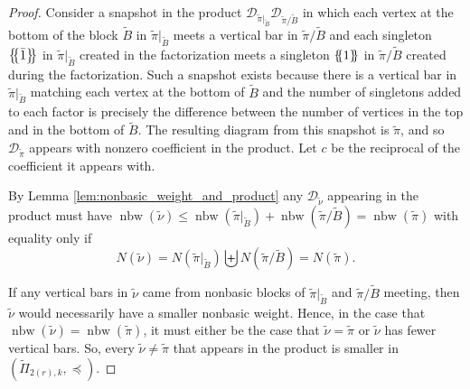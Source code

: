 \documentclass[10pt]{amsart}
\theoremstyle{definition}
\theoremstyle{definition}
\theoremstyle{plain}
\theoremstyle{remark}
\theoremstyle{plain}
\theoremstyle{plain}
\newcommand{\DD}{\mathcal{D}}
\newcommand{\tpi}{{\tilde{\pi}}}
\newcommand{\tnu}{{\tilde{\nu}}}
\newcommand{\tB}{{\tilde{B}}}
\newcommand{\multi}[1]{\left\{\mskip-5mu\left\{#1\right\}\mskip-5mu\right\}}
\newcommand{\ov}[1]{\bar{#1}}
\DeclareMathOperator{\nbw}{nbw}
\begin{document}
\begin{proof}

    Consider a snapshot in the product $\DD_{\tpi|_{\tB}}\DD_{\tpi/\tB}$ in which each vertex at the bottom of the block $\tB$ in $\tpi|_{\tB}$ meets a vertical bar in $\tpi/\tB$ and each singleton $\multi{\ov1}$ in $\tpi|_{\tB}$ created in the factorization meets a singleton $\multi{1}$ in $\tpi/\tB$ created during the factorization. Such a snapshot exists because there is a vertical bar in $\tpi|_{\tB}$ matching each vertex at the bottom of $\tB$ and the number of singletons added to each factor is precisely the difference between the number of vertices in the top and in the bottom of $\tB$. The resulting diagram from this snapshot is $\tpi$, and so $\DD_\tpi$ appears with nonzero coefficient in the product. Let $c$ be the reciprocal of the coefficient it appears with.

    By Lemma \ref{lem:nonbasic_weight_and_product} any $\DD_\tnu$ appearing in the product must have $\nbw(\tnu)\leq\nbw(\tpi|_{\tB})+\nbw(\tpi/\tB)=\nbw(\tpi)$ with equality only if \[N(\tnu)=N(\tpi|_{\tB})\biguplus N(\tpi/\tB)=N(\tpi).\]

    If any vertical bars in $\tnu$ came from nonbasic blocks of $\tpi|_{\tB}$ and $\tpi/\tB$ meeting, then $\tnu$ would necessarily have a smaller nonbasic weight. Hence, in the case that $\nbw(\tnu)=\nbw(\tpi)$, it must either be the case that $\tnu=\tpi$ or $\tnu$ has fewer vertical bars. So, every $\tnu\neq\tpi$ that appears in the product is smaller in $(\tilde\Pi_{2(r),k},\preceq)$.
\end{proof}
\end{document}
